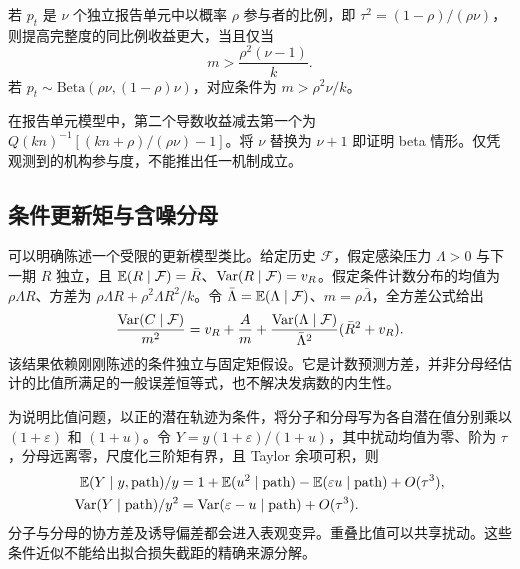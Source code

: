 \begin{corollary}[指定的报告机制]
\label{cor:switch}
若 $p_t$ 是 $\nu$ 个独立报告单元中以概率 $\rho$ 参与者的比例，即 $\tau^2=(1-\rho)/(\rho\nu)$，则提高完整度的同比例收益更大，当且仅当
\begin{equation}
 m>\frac{\rho^2(\nu-1)}{k}.
 \label{eq:r3-switch}
\end{equation}
若 $p_t\sim\mathrm{Beta}(\rho\nu,(1-\rho)\nu)$，对应条件为 $m>\rho^2\nu/k$。
\end{corollary}

在报告单元模型中，第二个导数收益减去第一个为 $Q(kn)^{-1}[(kn+\rho)/(\rho\nu)-1]$。将 $\nu$ 替换为 $\nu+1$ 即证明 beta 情形。仅凭观测到的机构参与度，不能推出任一机制成立。

\subsection{条件更新矩与含噪分母}
\label{app:renewal}
\label{app:random-denominator}

可以明确陈述一个受限的更新模型类比。给定历史 $\mathcal F$，假定感染压力 $\Lambda>0$ 与下一期 $R$ 独立，且 $\mathbb{E}(R\mid\mathcal F)=\bar R$、$\mathrm{Var}(R\mid\mathcal F)=v_R$。假定条件计数分布的均值为 $\rho\Lambda R$、方差为 $\rho\Lambda R+\rho^2\Lambda R^2/k$。令 $\bar\Lambda=\mathbb{E}(\Lambda\mid\mathcal F)$、$m=\rho\bar\Lambda$，全方差公式给出
\begin{equation}
 \frac{\mathrm{Var}(C\mid\mathcal F)}{m^2}
 =v_R+\frac{A}{m}
   +\frac{\mathrm{Var}(\Lambda\mid\mathcal F)}{\bar\Lambda^2}(\bar R^2+v_R).
 \label{eq:renewal-conditional}
\end{equation}
该结果依赖刚刚陈述的条件独立与固定矩假设。它是计数预测方差，并非分母经估计的比值所满足的一般误差恒等式，也不解决发病数的内生性。

为说明比值问题，以正的潜在轨迹为条件，将分子和分母写为各自潜在值分别乘以 $(1+\varepsilon)$ 和 $(1+u)$。令 $Y=y(1+\varepsilon)/(1+u)$，其中扰动均值为零、阶为 $\tau$，分母远离零，尺度化三阶矩有界，且 Taylor 余项可积，则
\begin{equation}
\begin{aligned}
 \mathbb{E}(Y\mid y,\text{path})/y
 &=1+\mathbb{E}(u^2\mid\text{path})-\mathbb{E}(\varepsilon u\mid\text{path})+O(\tau^3),\\
 \mathrm{Var}(Y\mid\text{path})/y^2
 &=\mathrm{Var}(\varepsilon-u\mid\text{path})+O(\tau^3).
\end{aligned}
\end{equation}
分子与分母的协方差及诱导偏差都会进入表观变异。重叠比值可以共享扰动。这些条件近似不能给出拟合损失截距的精确来源分解。

